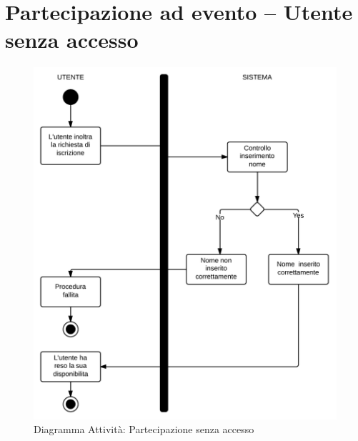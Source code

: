 \section{Partecipazione ad evento – Utente senza accesso}
\begin{figure}[H]
\centering
\includegraphics[scale=0.25]{img/activity/PartSa.png}
\caption{Diagramma Attività: Partecipazione senza accesso}
\label{fig:attpartSa}
\end{figure}

